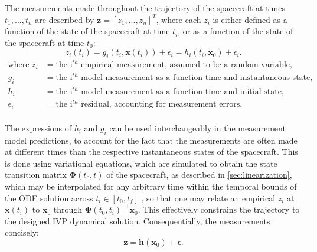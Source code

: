 The measurements made throughout the trajectory of the spacecraft at times
$t_1,...,t_n$ are described by $\bm{z}=[z_1,...,z_n]^T$, where each $z_i$ is
either defined as a function of the state of the spacecraft at time $t_i$, or
as a function of the state of the spacecraft at time $t_0$:
\begin{equation}
    z_i(t_i) = g_i(t_i, \bm{x}(t_i))+\epsilon_i = h_i(t_i, \bm{x}_0)+\epsilon_i.
\end{equation}
\begin{equation*}
    \begin{aligned}
        \textrm{where  }
            z_i &= \text{the i$^{th}$ empirical measurement, assumed to be a random variable,} \\
            g_i &= \text{the i$^{th}$ model measurement as a function time and instantaneous state,} \\
            h_i &= \text{the i$^{th}$ model measurement as a function time and initial state,} \\
            \epsilon_i &= \text{the i$^{th}$ residual, accounting for measurement errors.} \\
    \end{aligned}
\end{equation*}

The expressions of $h_i$ and $g_i$ can be used interchangeably in the
measurement model predictions, to account for the fact that the measurements are
often made at different times than the respective instantaneous states of the
spacecraft. This is done using variational equations, which are simulated to
obtain the state transition matrix $\bm{\Phi}(t_0, t)$ of the spacecraft, as
described in \autoref{sec:linearization}, which may be interpolated for any
arbitrary time within the temporal bounds of the ODE solution across
$t_i\in[t_0, t_f]$ \cite[p.~]{Montenbruck2000}, so that one may relate an
empirical $z_i$ at $\bm{x}(t_i)$ to $\bm{x}_0$ through $\bm{\Phi}(t_0,
t_i)^{-1}\bm{x}_0$. This effectively constrains the trajectory to the designed
IVP dynamical solution. Consequentially, the measurements concisely:
\begin{equation}
    \bm{z} = \bm{h}(\bm{x}_0) + \bm{\epsilon}.
\end{equation}




